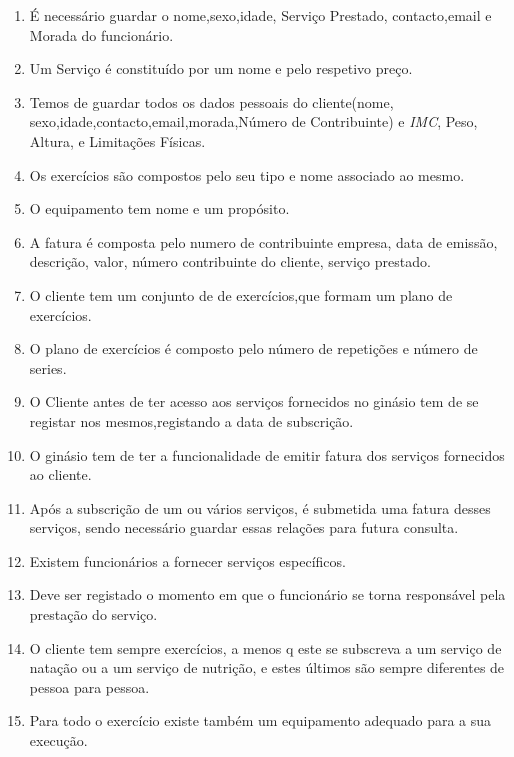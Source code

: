 \begin{enumerate}
    \item  É necessário guardar o nome,sexo,idade, Serviço Prestado, contacto,email e Morada do funcionário. 
    \item Um Serviço é constituído por um nome e pelo respetivo preço.
    \item Temos de guardar todos os dados pessoais do cliente(nome, sexo,idade,contacto,email,morada,Número de Contribuinte) e \textit{IMC}, Peso, Altura, e Limitações Físicas.
    \item Os exercícios são compostos pelo seu tipo e nome associado ao mesmo.
    \item O equipamento tem nome e um propósito. 
    \item A fatura é composta pelo numero de contribuinte empresa, data de emissão, descrição, valor, número contribuinte do cliente, serviço prestado.
    
\item O cliente tem um conjunto de  de exercícios,que formam um plano de exercícios.

\item O plano de exercícios é composto pelo número de repetições e número de series.

\item O Cliente antes de ter acesso aos serviços fornecidos no ginásio tem de se registar nos mesmos,registando a data de subscrição.

\item O ginásio tem de ter a funcionalidade de emitir fatura dos serviços fornecidos ao cliente.

\item Após a subscrição de um ou vários serviços, é submetida uma fatura desses serviços, sendo necessário guardar essas relações para futura consulta.

\item Existem funcionários a fornecer serviços específicos.

\item Deve ser registado o momento em que o funcionário se torna responsável pela prestação do serviço.


\item O cliente tem sempre exercícios, a menos q este se subscreva a um serviço de natação ou a um serviço de nutrição, e estes últimos são sempre diferentes de pessoa para pessoa.

\item Para todo o exercício existe também um equipamento adequado para a sua execução.
\par
\end{enumerate}
